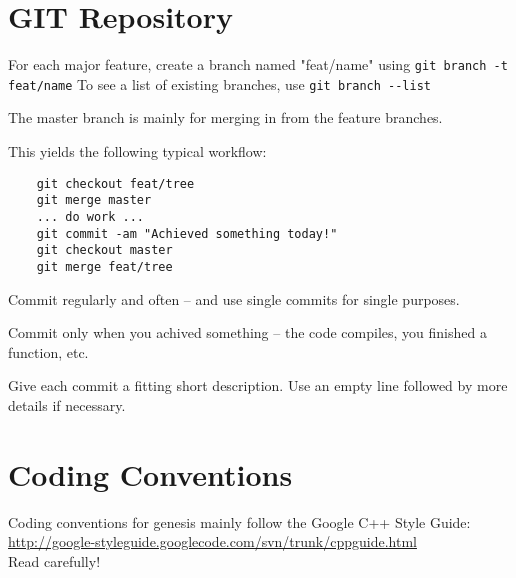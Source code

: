 \documentclass[a4paper,10pt]{article}
\begin{document}

\section{GIT Repository}
\label{sec:GitRepository}

For each major feature, create a branch named "feat/name" using \verb|git branch -t feat/name|
To see a list of existing branches, use \verb|git branch --list|

The master branch is mainly for merging in from the feature branches.

This yields the following typical workflow:
\begin{verbatim}
    git checkout feat/tree
    git merge master
    ... do work ...
    git commit -am "Achieved something today!"
    git checkout master
    git merge feat/tree
\end{verbatim} 

Commit regularly and often -- and use single commits for single purposes.

Commit only when you achived something -- the code compiles, you finished a function, etc.

Give each commit a fitting short description. Use an empty line followed by more details if necessary.

% 

\section{Coding Conventions}
\label{sec:CodingConventions}

Coding conventions for genesis mainly follow the Google C++ Style Guide: \href{http://google-styleguide.googlecode.com/svn/trunk/cppguide.html}{http://google-styleguide.googlecode.com/svn/trunk/cppguide.html}
\\
Read carefully!
\end{document}
